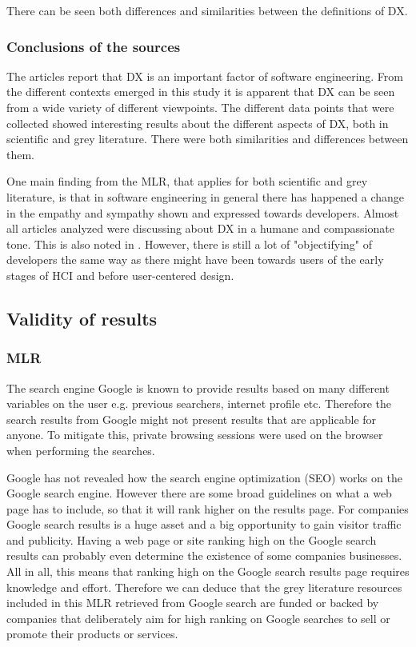 \documentclass[english, 12pt, a4paper, sci, utf8, a-1b, online]{aaltothesis}
\begin{document}
There can be seen both differences and similarities between the definitions of DX.

\subsubsection{Conclusions of the sources}

The articles report that DX is an important factor of software engineering. From the different contexts emerged in this study it is apparent that DX can be seen from a wide variety of different viewpoints. The different data points that were collected showed interesting results about the different aspects of DX, both in scientific and grey literature. There were both similarities and differences between them.

One main finding from the MLR, that applies for both scientific and grey literature, is that in software engineering in general there has happened a change in the empathy and sympathy shown and expressed towards developers. Almost all articles analyzed were discussing about DX in a humane and compassionate tone. This is also noted in \textcite{voice-of-the-developer}. However, there is still a lot of "objectifying" of developers the same way as there might have been towards users of the early stages of HCI and before user-centered design.

\subsection{Validity of results}

\subsubsection{MLR}

The search engine Google is known to provide results based on many different variables on the user e.g. previous searchers, internet profile etc. Therefore the search results from Google might not present results that are applicable for anyone. To mitigate this, private browsing sessions were used on the browser when performing the searches.

Google has not revealed how the search engine optimization (SEO) works on the Google search engine. However there are some broad guidelines on what a web page has to include, so that it will rank higher on the results page. For companies Google search results is a huge asset and a big opportunity to gain visitor traffic and publicity. Having a web page or site ranking high on the Google search results can probably even determine the existence of some companies businesses. All in all, this means that ranking high on the Google search results page requires knowledge and effort. Therefore we can deduce that the grey literature resources included in this MLR retrieved from Google search are funded or backed by companies that deliberately aim for high ranking on Google searches to sell or promote their products or services.
\end{document}
